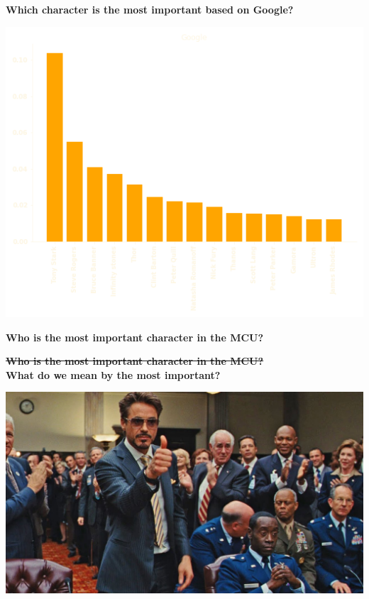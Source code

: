 \documentclass{beamer}
\begin{document}
\begin{frame}
    \centering
    \textbf{\large{Which character is the most important based on Google?}}
\end{frame}

\begin{frame}
    \centering
    \includegraphics[width=\textwidth]{static/page_rank.png}
\end{frame}

\begin{frame}
    \centering
    \textbf{\large{Who is the most important character in the MCU?}}
\end{frame}

\begin{frame}
    \centering
    \textbf{\large{\st{Who is the most important character in the MCU?}}} \\ \vspace{10pt}
    \textbf{\large{What do we mean by the most important?}}
\end{frame}

\begin{frame}
    \centering
    \includegraphics[width=\textwidth]{static/tony_stark.jpg}
\end{frame}
\end{document}
